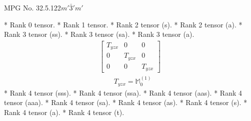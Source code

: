 \documentclass[fleqn,8pt,landscape]{jsarticle}
\begin{document}
\setcounter{MaxMatrixCols}{32}

\renewcommand{\tablename}{Table~}
\renewcommand{\figurename}{Figure~}
\begin{center}
\LARGE
MPG No. 32.5.122\quad$m'\bar{3}'m'$
\end{center}
* Rank 0 tensor.
* Rank 1 tensor.
* Rank 2 tensor (s).
* Rank 2 tensor (a).
* Rank 3 tensor (ss).
* Rank 3 tensor (sa).
* Rank 3 tensor (a).
\begin{align*}
\begin{bmatrix} T_{yzx} & 0 & 0 \\ 0 & T_{yzx} & 0 \\ 0 & 0 & T_{yzx} \end{bmatrix}
\end{align*}
\begin{align*}
& T_{yzx} = \mathbb{M}_{0}^{(1)}
\end{align*}
* Rank 4 tensor (sss).
* Rank 4 tensor (ssa).
* Rank 4 tensor (aas).
* Rank 4 tensor (aaa).
* Rank 4 tensor (sa).
* Rank 4 tensor (as).
* Rank 4 tensor (s).
* Rank 4 tensor (a).
* Rank 4 tensor (t).
\end{document}
